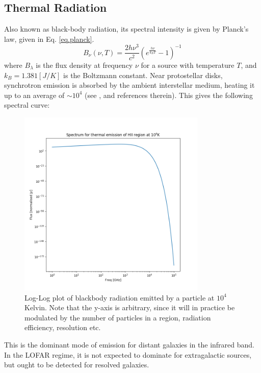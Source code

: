 \subsection{Thermal Radiation}
\pg
Also known as black-body radiation, its spectral intensity is given by Planck's law, given in Eq. \ref{eq.planck}.
\begin{equation}\label{eq.planck}
B_\nu(\nu,T) = \frac{2h\nu^3}{c^2}\left(e^\frac{h\nu}{k_BT}-1\right)^{-1}
\end{equation}
where $B_\lambda$ is the flux density at frequency $\nu$ for a source with temperature $T$, and $k_B=1.381 \left[J/K\right]$ is the Boltzmann constant. Near protostellar disks, synchrotron emission is absorbed by the ambient interstellar medium, heating it up to an average of $\sim 10^4$ (see ,  and references therein). This gives the following spectral curve:

\begin{figure}[!h]
\centering
\includegraphics[width=0.8\textwidth]{images/ThermalEmission.png}
\caption{\label{plot.thermal}Log-Log plot of blackbody radiation emitted by a particle at $10^4$ Kelvin. Note that the y-axis is arbitrary, since it will in practice be modulated by the number of particles in a region, radiation efficiency, resolution etc.}
\end{figure}
\pg
This is the dominant mode of emission for distant galaxies in the infrared band. In the LOFAR regime, it is not expected to dominate for extragalactic sources, but ought to be detected for resolved galaxies.

